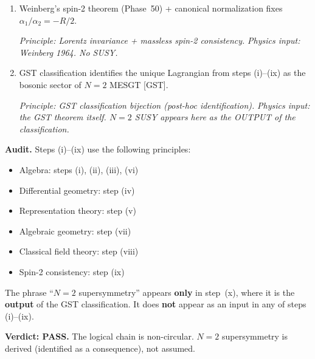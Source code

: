 \begin{enumerate}
    \textit{Principle: classical field theory (gauge invariance +
    integrability of field equations).}
    \textit{Physics input: gauge invariance of the action. No SUSY.}

  \item[(ix)] Weinberg's spin-2 theorem (Phase~50) + canonical
    normalization fixes $\alpha_1/\alpha_2 = -R/2$.

    \textit{Principle: Lorentz invariance + massless spin-2 consistency.}
    \textit{Physics input: Weinberg 1964. No SUSY.}

  \item[(x)] GST classification identifies the unique Lagrangian
    from steps (i)--(ix) as the bosonic sector of $N=2$ MESGT [GST].

    \textit{Principle: GST classification bijection (post-hoc identification).}
    \textit{Physics input: the GST theorem itself. $N=2$ SUSY appears
    here as the OUTPUT of the classification.}
\end{enumerate}

\medskip

\textbf{Audit.} Steps (i)--(ix) use the following principles:
\begin{itemize}
  \item Algebra: steps (i), (ii), (iii), (vi)
  \item Differential geometry: step (iv)
  \item Representation theory: step (v)
  \item Algebraic geometry: step (vii)
  \item Classical field theory: step (viii)
  \item Spin-2 consistency: step (ix)
\end{itemize}

The phrase ``$N=2$ supersymmetry'' appears \textbf{only} in step~(x),
where it is the \textbf{output} of the GST classification. It does
\textbf{not} appear as an input in any of steps (i)--(ix).

\textbf{Verdict: PASS.} The logical chain is non-circular. $N=2$
supersymmetry is derived (identified as a consequence), not assumed.

\medskip

